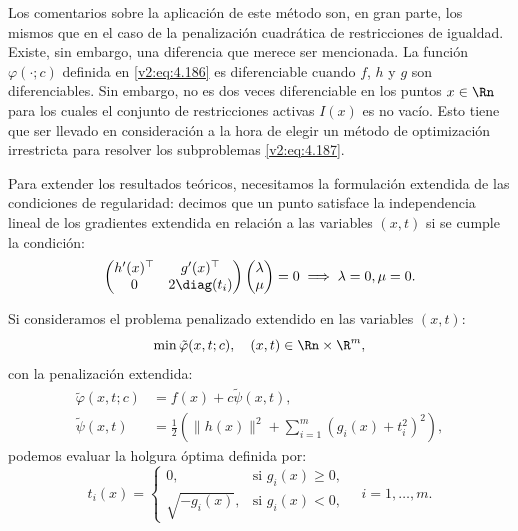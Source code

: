 Los comentarios sobre la aplicación de este método son, en gran parte, los mismos que en el caso de la penalización cuadrática de restricciones de igualdad. Existe, sin embargo, una diferencia que merece ser mencionada. La función $\varphi(\cdot; c)$ definida en \eqref{v2:eq:4.186} es diferenciable cuando $f$, $h$ y $g$ son diferenciables. Sin embargo, no es dos veces diferenciable en los puntos $x \in \Rn$ para los cuales el conjunto de restricciones activas $I(x)$ es no vacío. Esto tiene que ser llevado en consideración a la hora de elegir un método de optimización irrestricta para resolver los subproblemas \eqref{v2:eq:4.187}.

Para extender los resultados teóricos, necesitamos la formulación extendida de las condiciones de regularidad: decimos que un punto satisface la independencia lineal de los gradientes extendida en relación a las variables $(x, t)$ si se cumple la condición:
\begin{equation}
    \begin{pmatrix}
        h'(x)^\top & g'(x)^\top \\
        0 & 2 \diag(t_i)
    \end{pmatrix} \begin{pmatrix} \lambda \\ \mu \end{pmatrix} = 0 \implies \lambda = 0, \mu = 0.
    \label{v2:eq:4.191}
\end{equation}

Si consideramos el problema penalizado extendido en las variables $(x, t)$:
\begin{equation}
    \min \tilde{\varphi}(x, t; c), \quad (x, t) \in \Rn \times \R^m,
    \label{v2:eq:4.197}
\end{equation}
con la penalización extendida:
\begin{align}
    \tilde{\varphi}(x, t; c) &= f(x) + c\tilde{\psi}(x, t), \label{v2:eq:4.195} \\
    \tilde{\psi}(x, t) &= \frac{1}{2} \left( \|h(x)\|^2 + \sum_{i=1}^m (g_i(x) + t_i^2)^2 \right), \label{v2:eq:4.196}
\end{align}
podemos evaluar la holgura óptima definida por:
\begin{equation}
    t_i(x) = \begin{cases} 0, & \text{si } g_i(x) \ge 0, \\ \sqrt{-g_i(x)}, & \text{si } g_i(x) < 0, \end{cases} \quad i = 1, \dots, m.
    \label{v2:eq:4.198}
\end{equation}

